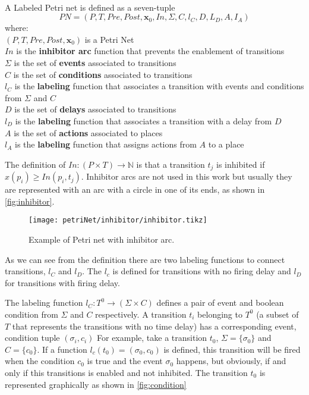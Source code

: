 \begin{definition}
  \label{def:cipn}~\\
  A Labeled Petri net is defined as a seven-tuple
  \[PN = (P,T,Pre,Post,\mathbf{x}_0,In,\Sigma,C,l_C,D,L_D,A,I_A)\]
  where: \\
  \indent $(P,T,Pre,Post,\mathbf{x}_0)$ is a Petri Net\\
  \indent $In$ is the \textbf{inhibitor arc} function that prevents the
  enablement of transitions \\
  \indent $\Sigma$ is the set of \textbf{events} associated to transitions \\
  \indent $C$ is the set of \textbf{conditions} associated to transitions \\
  \indent $l_C$ is the \textbf{labeling} function that associates a transition
  with events and conditions from $\Sigma$ and $C$\\
  \indent $D$ is the set of \textbf{delays} associated to transitions \\
  \indent $l_D$ is the \textbf{labeling} function that associates a transition with a delay from $D$ \\
  \indent $A$ is the set of \textbf{actions} associated to places \\
  \indent $l_A$ is the \textbf{labeling} function that assigns actions from $A$ to a place \\
\end{definition}
The definition of $In : (P \times T )\rightarrow\mathbb{N}$ is that a transition
$t_j$ is inhibited if $x(p_i)\geq In(p_i,t_j)$. Inhibitor arcs are not used in
this work but usually they are represented with an arc with a circle in one of
its ends, as shown in \autoref{fig:inhibitor}.

\begin{figure}[H]
  \centering
  \texttt{[image: petriNet/inhibitor/inhibitor.tikz]}
  \caption{Example of Petri net with inhibitor arc.}
  \label{fig:inhibitor}
\end{figure}
As we can see from the definition there are two labeling functions to connect 
transitions, $l_C$ and $l_D$. The $l_c$ is defined for transitions with no
firing delay and $l_D$ for transitions with firing delay.

The labeling function $l_C : T^0\rightarrow(\Sigma \times C)$ defines a pair of
event and boolean condition from $\Sigma$ and $C$ respectively. A transition
$t_i$ belonging to $T^0$ (a subset of $T$ that represents the transitions with
no time delay) has a corresponding event, condition tuple $(\sigma_i,c_i)$
For example, take a transition $t_0$, $\Sigma =\{\sigma_0\}$ and $C=\{c_0\}$. If
a function $l_c(t_0)=(\sigma_0,c_0)$ is defined, this transition will be fired
when the condition $c_0$ is true and the event $\sigma_0$
happens, but obviously, if and only if this transitions is enabled and not
inhibited. The transition $t_0$ is represented graphically as shown in \autoref{fig:condition}

